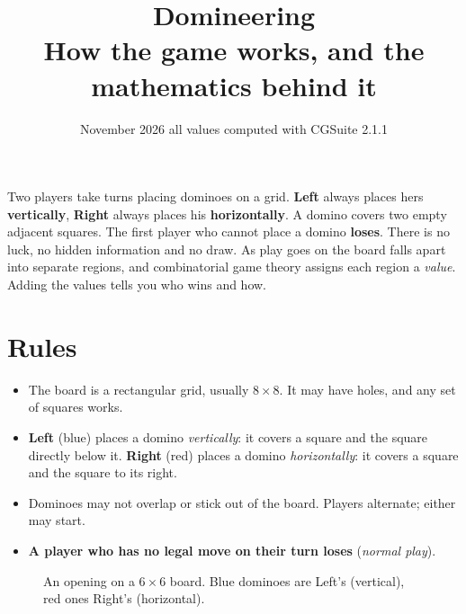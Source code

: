 \documentclass[11pt,a4paper]{article}
\title{\sffamily\bfseries Domineering\\[2pt]
  \large\mdseries How the game works, and the mathematics behind it}
\author{}
\date{\small November 2026 \textperiodcentered{} all values computed with CGSuite 2.1.1}
\newcommand{\grid}[2]{\draw[gridc, line width=0.5pt] (0,0) grid (#2,-#1);}
\newcommand{\vd}[2]{\fill[leftc, rounded corners=1.5pt]
  ({#2-1+0.13},{-#1-1+0.13}) rectangle ({#2-0.13},{-#1+1-0.13});}
\newcommand{\hd}[2]{\fill[rightc, rounded corners=1.5pt]
  ({#2-1+0.13},{-#1+0.13}) rectangle ({#2+1-0.13},{-#1+1-0.13});}
\begin{document}
\maketitle
\thispagestyle{fancy}

\begin{keybox}[title=In one paragraph]
Two players take turns placing dominoes on a grid.  \textcolor{leftc}{\textbf{Left}} always
places hers \textcolor{leftc}{\textbf{vertically}}, \textcolor{rightc}{\textbf{Right}} always places his
\textcolor{rightc}{\textbf{horizontally}}.  A domino covers two empty adjacent squares.  The first player
who cannot place a domino \textbf{loses}.  There is no luck, no hidden information and no draw.
As play goes on the board falls apart into separate regions, and combinatorial game theory
assigns each region a \emph{value}.  Adding the values tells you who wins and how.
\end{keybox}

\section{Rules}

\begin{itemize}
  \item The board is a rectangular grid, usually $8\times 8$.  It may have holes, and any set of
        squares works.
  \item \textbf{Left} (blue) places a domino \emph{vertically}: it covers a square and the square
        directly below it.  \textbf{Right} (red) places a domino \emph{horizontally}: it covers a
        square and the square to its right.
  \item Dominoes may not overlap or stick out of the board.  Players alternate; either may start.
  \item \textbf{A player who has no legal move on their turn loses} (\emph{normal play}).
\end{itemize}

\begin{figure}[h]
\centering
{}
\caption{An opening on a $6\times6$ board.  Blue dominoes are Left's (vertical), red ones Right's
(horizontal).}
\end{figure}
\end{document}
